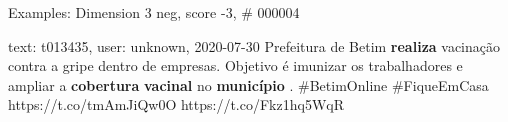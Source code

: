 \begin{frame}{Examples: Dimension 3 neg, score -3, \# 000004}
\footnotesize
\begin{alertblock}{text: t013435, user: unknown, 2020-07-30}
Prefeitura de Betim \textbf{realiza} vacinação contra a gripe dentro de 
empresas. Objetivo é imunizar os trabalhadores e ampliar a \textbf{cobertura} 
\textbf{vacinal} no \textbf{município} . \#BetimOnline \#FiqueEmCasa 
https://t.co/tmAmJiQw0O https://t.co/Fkz1hq5WqR 
\end{alertblock}
\end{frame}
